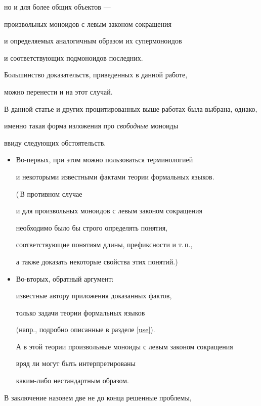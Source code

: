  но и для более общих объектов ---


 произвольных моноидов с левым законом сокращения


 и определяемых аналогичным образом их супермоноидов


 и соответствующих подмоноидов последних.


 Большинство доказательств, приведенных в данной работе,


 можно перенести и на этот случай.





 В данной статье и других процитированных выше работах была выбрана, однако,


 именно такая форма изложения про {\it свободные} моноиды


 ввиду следующих обстоятельств.


 \begin{itemize}


 \item


 Во-первых, при этом можно пользоваться терминологией


 и некоторыми известными фактами теории формальных языков.


 (\,В противном случае


 и для произвольных моноидов с левым законом сокращения


 необходимо было бы строго определять понятия,


 соответствующие понятиям длины, префиксности и т.\,п.,


 а также доказать некоторые свойства этих понятий.)


 \item


 Во-вторых, обратный аргумент:


 известные автору приложения доказанных фактов,


 только задачи теории формальных языков


 (напр., подробно описанные в разделе \ref{use}).


 А в этой теории произвольные моноиды с левым законом сокращения


 вряд ли могут быть интерпретированы


 каким-либо нестандартным образом.


 \end{itemize}





 В заключение назовем две не до конца решенные проблемы,


